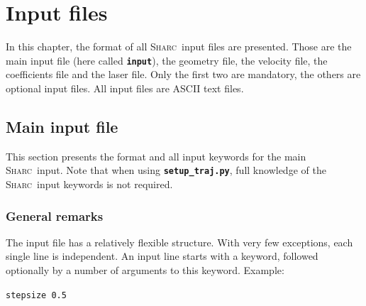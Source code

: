 \documentclass[a4paper,11pt,DIV=15,openany,twoside=false]{scrbook}
\newcommand{\sharc}{\textsc{Sharc}}
\newcommand{\ttt}[1]{\textbf{\texttt{#1}}}
\newenvironment{example}{
  \vspace{0mm}
  \definecolor{shadecolor}{HTML}{E4F4FF}
  \begin{shaded}
}{
  \end{shaded}
}
\begin{document}

\chapter{Input files}\label{chap:input}


In this chapter, the format of all \sharc\ input files are presented. Those are the main input file (here called \ttt{input}), the geometry file, the velocity file, the coefficients file and the laser file. Only the first two are mandatory, the others are optional input files. All input files are ASCII text files.


\section{Main input file}\label{sec:inputfile}

This section presents the format and all input keywords for the main \sharc\ input. Note that when using \ttt{setup\_traj.py}, full knowledge of the \sharc\ input keywords is not required.

\subsection{General remarks}

The input file has a relatively flexible structure. With very few exceptions, each single line is independent. An input line starts with a keyword, followed optionally by a number of arguments to this keyword. Example:

\begin{example}
  \verb|stepsize 0.5|
\end{example}
\end{document}
